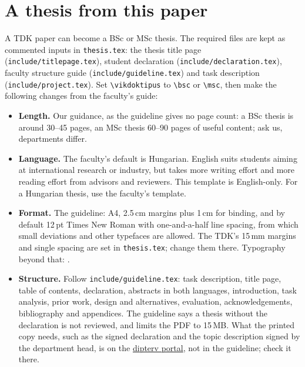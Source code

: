 \section{A thesis from this paper}\label{app:tdk:thesis}
A TDK paper can become a BSc or MSc thesis. The required files are kept as commented inputs in \texttt{thesis.tex}: the thesis title page (\texttt{include/titlepage.tex}), student declaration (\texttt{include/declaration.tex}), faculty structure guide (\texttt{include/guideline.tex}) and task description (\texttt{include/project.tex}). Set \texttt{\textbackslash vikdoktipus} to \texttt{\textbackslash bsc} or \texttt{\textbackslash msc}, then make the following changes from the faculty's guide:
\begin{itemize}[noitemsep]
  \item \textbf{Length.} Our guidance, as the guideline gives no page count: a BSc thesis is around 30--45 pages, an MSc thesis 60--90 pages of useful content; ask us, departments differ.
  \item \textbf{Language.} The faculty's default is Hungarian. English suits students aiming at international research or industry, but takes more writing effort and more reading effort from advisors and reviewers. This template is English-only. For a Hungarian thesis, use the faculty's template.
  \item \textbf{Format.} The guideline: A4, 2.5\,cm margins plus 1\,cm for binding, and by default 12\,pt Times New Roman with one-and-a-half line spacing, from which small deviations and other typefaces are allowed. The TDK's 15\,mm margins and single spacing are set in \texttt{thesis.tex}; change them there. Typography beyond that: \citet{guide:Jeney}.
  \item \textbf{Structure.} Follow \texttt{include/guideline.tex}: task description, title page, table of contents, declaration, abstracts in both languages, introduction, task analysis, prior work, design and alternatives, evaluation, acknowledgements, bibliography and appendices. The guideline says a thesis without the declaration is not reviewed, and limits the PDF to 15\,MB. What the printed copy needs, such as the signed declaration and the topic description signed by the department head, is on the \href{https://diplomaterv.vik.bme.hu/}{dipterv portal}, not in the guideline; check it there.
\end{itemize}
